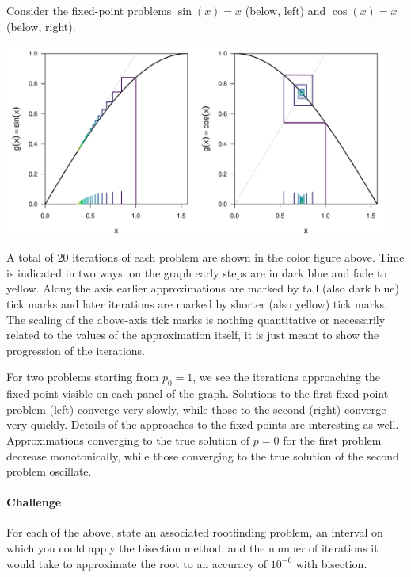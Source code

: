 \documentclass[12pt]{article}
\begin{document}
Consider the fixed-point problems \(\sin(x) = x\) (below, left) and \(\cos(x) = x\) (below, right).
%
\begin{center}
\includegraphics[width=0.95\textwidth]{fixpt_trig.pdf}
\end{center}
%
A total of \(20\) iterations of each problem are shown in the color figure above.  Time is indicated in two ways: on the graph early steps are in dark blue and fade to yellow.  Along the axis earlier approximations are marked by tall (also dark blue) tick marks and later iterations are marked by shorter (also yellow) tick marks.  The scaling of the above-axis tick marks is nothing quantitative or necessarily related to the values of the approximation itself, it is just meant to show the progression of the iterations.

For two problems starting from \(p_0=1\), we see the iterations approaching the fixed point visible on each panel of the graph.  Solutions to the first fixed-point problem (left) converge very slowly, while those to the second (right) converge very quickly.  Details of the approaches to the fixed points are interesting as well.  Approximations converging to the true solution of \(p=0\) for the first problem decrease monotonically, while those converging to the true solution of the second problem oscillate.

\paragraph{Challenge} For each of the above, state an associated rootfinding problem, an interval on which you could apply the bisection method, and the number of iterations it would take to approximate the root to an accuracy of \(10^{-6}\) with bisection.
\end{document}
